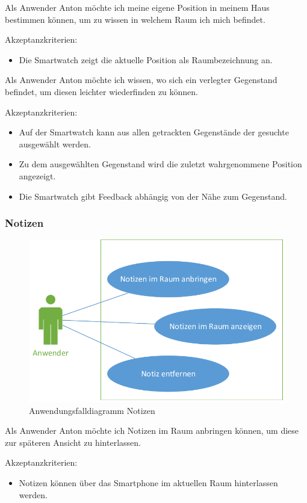 \newpage
Als Anwender Anton möchte ich meine eigene Position in meinem Haus bestimmen können, um zu wissen in welchem Raum ich mich befindet. 

Akzeptanzkriterien:
\begin{itemize}
\item Die Smartwatch zeigt die aktuelle Position als Raumbezeichnung an.
\end{itemize}

Als Anwender Anton möchte ich wissen, wo sich ein verlegter Gegenstand befindet, um diesen leichter wiederfinden zu können.

Akzeptanzkriterien:
\begin{itemize}
\item Auf der Smartwatch kann aus allen getrackten Gegenstände der gesuchte ausgewählt werden.
\item Zu dem ausgewählten Gegenstand wird die zuletzt wahrgenommene Position angezeigt.
\item Die Smartwatch gibt Feedback abhängig von der Nähe zum Gegenstand.
\end{itemize}

\subsubsection{Notizen}
\begin{figure}[H]
\centering
\includegraphics[width=0.7\linewidth]{Bilder/UseCase-Notizen}
\caption{Anwendungsfalldiagramm Notizen}
\label{fig:UseCase-Notizen}
\end{figure}

Als Anwender Anton möchte ich Notizen im Raum anbringen können, um diese zur späteren Ansicht zu hinterlassen.

Akzeptanzkriterien:
\begin{itemize}
\item Notizen können über das Smartphone im aktuellen Raum hinterlassen werden.
\end{itemize}

